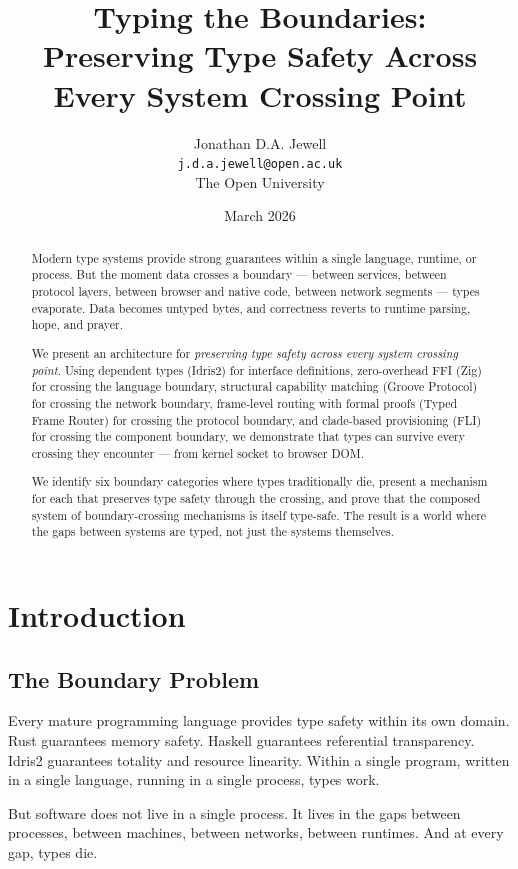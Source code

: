 \documentclass[11pt,a4paper]{article}
\title{Typing the Boundaries:\\
Preserving Type Safety Across Every System Crossing Point}
\author{Jonathan D.A. Jewell\\
\texttt{j.d.a.jewell@open.ac.uk}\\
The Open University}
\date{March 2026}
\begin{document}
\maketitle

\begin{abstract}
Modern type systems provide strong guarantees within a single language,
runtime, or process. But the moment data crosses a boundary --- between
services, between protocol layers, between browser and native code,
between network segments --- types evaporate. Data becomes untyped bytes,
and correctness reverts to runtime parsing, hope, and prayer.

We present an architecture for \emph{preserving type safety across every
system crossing point}. Using dependent types (Idris2) for interface
definitions, zero-overhead FFI (Zig) for crossing the language boundary,
structural capability matching (Groove Protocol) for crossing the network
boundary, frame-level routing with formal proofs (Typed Frame Router) for
crossing the protocol boundary, and clade-based provisioning (FLI) for
crossing the component boundary, we demonstrate that types can survive
every crossing they encounter --- from kernel socket to browser DOM.

We identify six boundary categories where types traditionally die,
present a mechanism for each that preserves type safety through the
crossing, and prove that the composed system of boundary-crossing
mechanisms is itself type-safe. The result is a world where the gaps
between systems are typed, not just the systems themselves.
\end{abstract}

\section{Introduction}

\subsection{The Boundary Problem}

Every mature programming language provides type safety within its own
domain. Rust guarantees memory safety. Haskell guarantees referential
transparency. Idris2 guarantees totality and resource linearity. Within
a single program, written in a single language, running in a single
process, types work.

But software does not live in a single process. It lives in the gaps
between processes, between machines, between networks, between runtimes.
And at every gap, types die.
\end{document}
